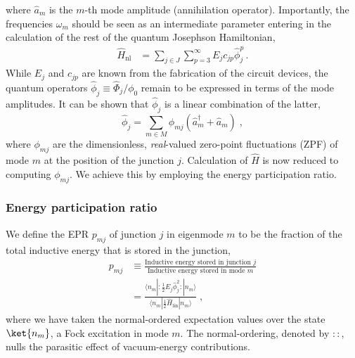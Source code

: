 where $\hat{a}_{m}$ is the $m$-th mode amplitude (annihilation operator).
Importantly, the frequencies $\omega_{m}$ should be seen as an intermediate
parameter entering in the calculation of the rest of the quantum Josephson
Hamiltonian, 
\begin{align}
\hat{H}_{\mathrm{nl}} & =\sum_{j\in J}\sum_{p=3}^{\infty}E_{j}c_{jp}\hat{\phi}_{j}^{p}\,.\label{ex:Hnl-multi}
\end{align}
While $E_{j}$ and $c_{jp}$ are known from the fabrication of the
circuit devices, the quantum operators $\hat{\phi}_{j}\equiv\hat{\Phi}_{j}/\phi_{0}$
remain to be expressed in terms of the mode amplitudes. It can be
shown that $\hat{\phi}_{j}$ is a linear combination of the latter,
\begin{equation}
\hat{\phi}_{j}=\sum_{m\in M}\phi_{mj}\left(\hat{a}_{m}^{\dagger}+\hat{a}_{m}\right)\;,\label{eq:multijj:ZPF defn}
\end{equation}
where $\phi_{mj}$ are the dimensionless, \textit{real}-valued zero-point
fluctuations (ZPF) of mode $m$ at the position of the junction $j$.
Calculation of $\hat{H}$ is now reduced to computing $\phi_{mj}$.
We achieve this by employing the energy participation ratio.

\subsubsection{Energy participation ratio }

We define the EPR $p_{mj}$ of junction $j$ in eigenmode $m$ to
be the fraction of the total inductive energy that is stored in the
junction, \begin{subequations} \label{eq:Pmj} 
\begin{align}
p_{mj} & \equiv\frac{\text{Inductive energy stored in junction }j}{\text{Inductive energy stored in mode }m}\label{eq:EPR-defn-verbal}\\
 & =\frac{\langle n_{m}|\colon\frac{1}{2}E_{j}\hat{\phi}_{j}^{2}\colon|n_{m}\rangle}{\langle n_{m}|\frac{1}{2}\hat{H}_{\mathrm{lin}}|n_{m}\rangle}\;,
\end{align}
\end{subequations}where we have taken the normal-ordered \citep{Gerry2005}
expectation values over the state $\ket{n_{m}}$, a Fock excitation
in mode $m$. The normal-ordering, denoted by $\colon\colon$, nulls
the parasitic effect of vacuum-energy contributions. 


